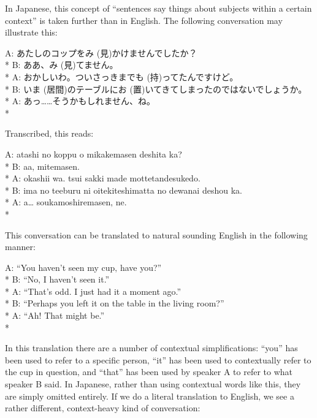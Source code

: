 \documentclass[11pt, b5paper, twoside, openright, onecolumn]{book}
\makeatletter
\newcommand*{\rubystack}[2]{{\relscale{0.5}%
  \begin{tabular}[b]{@{}c@{}}%
    {#1}\\%
   {\textscale{2}{#2}}%
  \end{tabular}}%
}
\DeclareRobustCommand*{\ruby}[2]{%
  \mbox{%
    \setlength{\parskip}{0ex}%
    \BeginAccSupp{method=pdfstringdef,ActualText={#1}}%
      \rubystack{\phantom{#2}}{#1}%
      \llap{%
        \rubystack{#2}{\phantom{#1}}%
      }%
    \EndAccSupp{}%
  }%
}
\renewcommand*{\ruby}[2]{#2 (#1)}%
\newenvironment{exampleblock}{
\setlength{\parindent}{0.6in}
\begin{minipage}[t]{\dimexpr\textwidth-\parindent}}
{\end{minipage}}
\makeatother
\begin{document}
In Japanese‚ this concept of “sentences say things about subjects within a certain context” is taken further than in English. The following conversation may illustrate this:

\vspace{0.4cm}
\begin{exampleblock}
A: あたしのコップを\ruby{見}{み}かけませんでしたか？ \\* 
B: ああ、\ruby{見}{み}てません。 \\* 
A: おかしいわ。ついさっきまで\ruby{持}{も}ってたんですけど。 \\* 
B: \ruby{居間}{いま}のテーブルに\ruby{置}{お}いてきてしまったのではないでしょうか。 \\* 
A: あっ……そうかもしれません、ね。 \\* 
\end{exampleblock}
\vspace{0.2cm}

Transcribed‚ this reads:

\vspace{0.4cm}
\begin{exampleblock}
A: atashi no koppu o mikakemasen deshita ka? \\* 
B: aa‚ mitemasen. \\* 
A: okashii wa. tsui sakki made mottetandesukedo. \\* 
B: ima no teeburu ni oitekiteshimatta no dewanai deshou ka. \\* 
A: a… soukamoshiremasen‚ ne. \\* 
\end{exampleblock}
\vspace{0.2cm}

This conversation can be translated to natural sounding English in the following manner:

\vspace{0.4cm}
\begin{exampleblock}
A: “You haven’t seen my cup‚ have you?” \\* 
B: “No‚ I haven’t seen it.” \\* 
A: “That’s odd. I just had it a moment ago.” \\* 
B: “Perhaps you left it on the table in the living room?” \\* 
A: “Ah! That might be.” \\* 
\end{exampleblock}
\vspace{0.2cm}

In this translation there are a number of contextual simplifications: “you” has been used to refer to a specific person‚ “it” has been used to contextually refer to the cup in question‚ and “that” has been used by speaker A to refer to what speaker B said. In Japanese‚ rather than using contextual words like this‚ they are simply omitted entirely. If we do a literal translation to English‚ we see a rather different‚ context-heavy kind of conversation:
\end{document}

